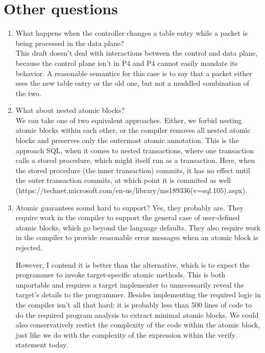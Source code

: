 \section{Other questions}
\begin{enumerate}
\item What happens when the controller changes a table entry while a packet is
being processed in the data plane? \\
This draft doesn't deal with interactions between the control and data plane,
because the control plane isn't in P4 and P4 cannot easily mandate its
behavior. A reasonable semantics for this case is to say that a packet either
sees the new table entry or the old one, but not a muddled combination of the
two.

\item What about nested atomic blocks?\\
We can take one of two equivalent approaches. Either, we forbid nesting
atomic blocks within each other, or the compiler removes all nested atomic
blocks and preserves only the outermost atomic annotation. This is the approach
SQL, when it comes to nested transactions, where one transaction calls a stored
procedure, which might itself run as a transaction. Here, when the stored
procedure (the inner transaction) commits, it has no effect until the outer
transaction commits, at which point it is commited as well
(https://technet.microsoft.com/en-us/library/ms189336(v=sql.105).aspx).

\item Atomic guarantees sound hard to support?
Yes, they probably are. They require work in the compiler to support the
general case of user-defined atomic blocks, which go beyond the language
defaults. They also require work in the compiler to provide reasonable error
messages when an atomic block is rejected.

However, I contend it is better than the alternative, which is to expect the
programmer to invoke target-specific atomic methods. This is both unportable
and requires a target implementer to unnecessarily reveal the target's details
to the programmer. Besides implementing the required logic in the compiler
isn't all that hard: it is probably less than 500 lines of code to do the
required program analysis to extract minimal atomic blocks. We could also
conservatively restict the complexity of the code within the atomic block, just
like we do with the complexity of the expression within the verify statement
today.


\end{enumerate}
